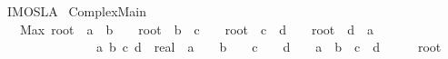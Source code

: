 %
\begin{isabellebody}%
%
%
\isadelimdocument
%
\endisadelimdocument
%
\isatagdocument
%
\isamarkuptrue%
%
\endisatagdocument
{\isafolddocument}%
%
\isadelimdocument
%
\endisadelimdocument
%
\isadelimtheory
%
\endisadelimtheory
%
\isatagtheory
{}\isamarkupfalse%
\ IMO{\isacharunderscore}{}{}{}{}{\isacharunderscore}SL{\isacharunderscore}A{}\isanewline
{}\ Complex{\isacharunderscore}Main\isanewline
{}%
\endisatagtheory
{\isafoldtheory}%
%
\isadelimtheory
\isanewline
%
\endisadelimtheory
\isanewline
{}\isamarkupfalse%
\isanewline
\ \ \ {\isachardoublequoteopen}Max\ {\isacharbraceleft}root\ {}\ {\isacharparenleft}a\ {\isacharslash}\ {\isacharparenleft}b\ {\isacharplus}\ {}{\isacharparenright}{\isacharparenright}\ {\isacharplus}\ root\ {}\ {\isacharparenleft}b\ {\isacharslash}\ {\isacharparenleft}c\ {\isacharplus}\ {}{\isacharparenright}{\isacharparenright}\ {\isacharplus}\ root\ {}\ {\isacharparenleft}c\ {\isacharslash}\ {\isacharparenleft}d\ {\isacharplus}\ {}{\isacharparenright}{\isacharparenright}\ {\isacharplus}\ root\ {}\ {\isacharparenleft}d\ {\isacharslash}\ {\isacharparenleft}a\ {\isacharplus}\ {}{\isacharparenright}{\isacharparenright}\ \isanewline
\ \ \ \ \ \ \ \ \ \ \ \ \ \ {\isacharbar}\ a\ b\ c\ d\ {\isacharcolon}{\isacharcolon}\ real\ {\isachardot}\ a\ {\isasymge}\ {}\ {\isasymand}\ b\ {\isasymge}\ {}\ {\isasymand}\ c\ {\isasymge}\ {}\ {\isasymand}\ d\ {\isasymge}\ {}\ {\isasymand}\ a\ {\isacharplus}\ b\ {\isacharplus}\ c\ {\isacharplus}\ d\ {\isacharequal}\ {}{}{}{\isacharbraceright}\ {\isacharequal}\ {}\ {\isacharslash}\ root\ {}\ {}{\isachardoublequoteclose}\isanewline
%
\isadelimproof
\ \ %
\endisadelimproof
%
\isatagproof
{}\isamarkupfalse%
%
\endisatagproof
{\isafoldproof}%
%
\isadelimproof
\isanewline
%
\endisadelimproof
%
\isadelimtheory
\isanewline
%
\endisadelimtheory
%
\isatagtheory
{}\isamarkupfalse%
%
\endisatagtheory
{\isafoldtheory}%
%
\isadelimtheory
%
\endisadelimtheory
%
\end{isabellebody}%
\endinput
